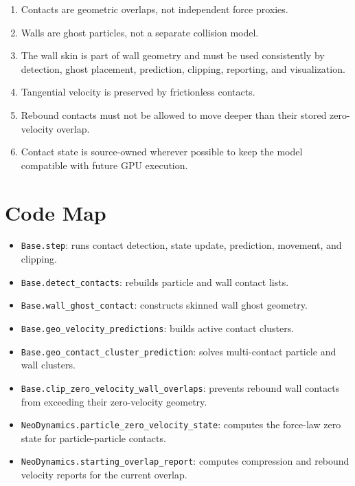 \documentclass[11pt]{article}
\begin{document}
\begin{enumerate}[noitemsep]
    \item Contacts are geometric overlaps, not independent force proxies.
    \item Walls are ghost particles, not a separate collision model.
    \item The wall skin is part of wall geometry and must be used consistently
          by detection, ghost placement, prediction, clipping, reporting, and
          visualization.
    \item Tangential velocity is preserved by frictionless contacts.
    \item Rebound contacts must not be allowed to move deeper than their stored
          zero-velocity overlap.
    \item Contact state is source-owned wherever possible to keep the model
          compatible with future GPU execution.
\end{enumerate}

\section{Code Map}

\begin{itemize}[noitemsep]
    \item \texttt{Base.step}: runs contact detection, state update, prediction,
          movement, and clipping.
    \item \texttt{Base.detect\_contacts}: rebuilds particle and wall contact
          lists.
    \item \texttt{Base.wall\_ghost\_contact}: constructs skinned wall ghost
          geometry.
    \item \texttt{Base.geo\_velocity\_predictions}: builds active contact
          clusters.
    \item \texttt{Base.geo\_contact\_cluster\_prediction}: solves multi-contact
          particle and wall clusters.
    \item \texttt{Base.clip\_zero\_velocity\_wall\_overlaps}: prevents rebound
          wall contacts from exceeding their zero-velocity geometry.
    \item \texttt{NeoDynamics.particle\_zero\_velocity\_state}: computes the
          force-law zero state for particle-particle contacts.
    \item \texttt{NeoDynamics.starting\_overlap\_report}: computes compression
          and rebound velocity reports for the current overlap.
\end{itemize}
\end{document}
